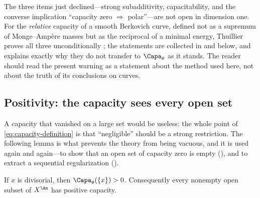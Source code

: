 \begin{remark}
\label{rem:ch25-curve-choquet-unconditional}
The three items just declined---strong subadditivity, capacitability, and
the converse implication ``capacity zero \(\Rightarrow\) polar''---are not
open in dimension one.  For the \emph{relative} capacity of a smooth
Berkovich curve, defined not as a supremum of Monge--Amp\`ere masses but as
the reciprocal of a minimal energy, Thuillier proves all three
unconditionally \cite[\S3.6]{Thu05}; the statements are collected in
 and
 below, and
 explains exactly why they do not transfer
to \(\Capa_\theta\) as it stands.  The reader should read the present
warning as a statement about the method used here, not about the truth of
its conclusions on curves.
\end{remark}

\subsection{Positivity: the capacity sees every open set}
\label{sec:ch25-positivity}

A capacity that vanished on a large set would be useless: the whole point of
\eqref{eq:capacity-definition} is that ``negligible'' should be a strong
restriction.  The following lemma is what prevents the theory from being
vacuous, and it is used again and again---to show that an open set of
capacity zero is empty (), and to
extract a sequential regularization
().

\begin{lemma}
\label{lem:divisorial-positive-capacity}
If \(x\) is divisorial, then \(\Capa_\theta(\{x\})>0\). Consequently every
nonempty open subset of \(X^{\An}\) has positive capacity.
\end{lemma}

